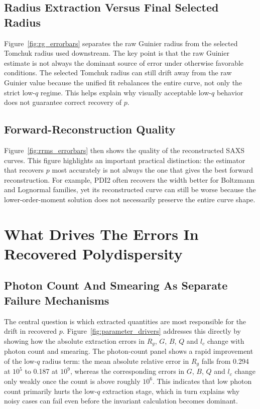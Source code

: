\documentclass[11pt]{article}
\begin{document}
\subsection{Radius Extraction Versus Final Selected Radius}
Figure~\ref{fig:rg_errorbars} separates the raw Guinier radius from the selected Tomchuk radius used downstream.
The key point is that the raw Guinier estimate is not always the dominant source of error under otherwise favorable conditions.
The selected Tomchuk radius can still drift away from the raw Guinier value because the unified fit rebalances the entire curve, not only the strict low-$q$ regime.
This helps explain why visually acceptable low-$q$ behavior does not guarantee correct recovery of $p$.

\subsection{Forward-Reconstruction Quality}
Figure~\ref{fig:rrms_errorbars} then shows the quality of the reconstructed SAXS curves.
This figure highlights an important practical distinction: the estimator that recovers $p$ most accurately is not always the one that gives the best forward reconstruction.
For example, PDI2 often recovers the width better for Boltzmann and Lognormal families, yet its reconstructed curve can still be worse because the lower-order-moment solution does not necessarily preserve the entire curve shape.

\section{What Drives The Errors In Recovered Polydispersity}
\subsection{Photon Count And Smearing As Separate Failure Mechanisms}
The central question is which extracted quantities are most responsible for the drift in recovered $p$.
Figure~\ref{fig:parameter_drivers} addresses this directly by showing how the absolute extraction errors in $R_g$, $G$, $B$, $Q$ and $l_c$ change with photon count and smearing.
The photon-count panel shows a rapid improvement of the low-$q$ radius term: the mean absolute relative error in $R_g$ falls from 0.294 at $10^{5}$ to 0.187 at $10^{9}$, whereas the corresponding errors in $G$, $B$, $Q$ and $l_c$ change only weakly once the count is above roughly $10^6$.
This indicates that low photon count primarily hurts the low-$q$ extraction stage, which in turn explains why noisy cases can fail even before the invariant calculation becomes dominant.
\end{document}
